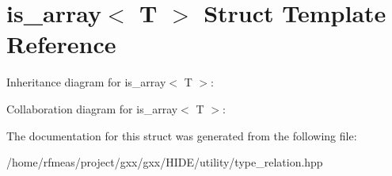 \hypertarget{structis__array}{}\section{is\+\_\+array$<$ T $>$ Struct Template Reference}
\label{structis__array}


Inheritance diagram for is\+\_\+array$<$ T $>$\+:


Collaboration diagram for is\+\_\+array$<$ T $>$\+:


The documentation for this struct was generated from the following file\+:\begin{DoxyCompactItemize}
\item 
/home/rfmeas/project/gxx/gxx/\+H\+I\+D\+E/utility/type\+\_\+relation.\+hpp\end{DoxyCompactItemize}
